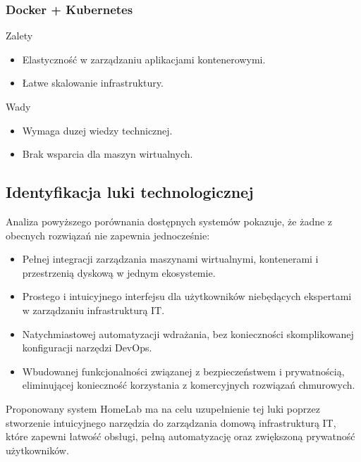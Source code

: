 \subsubsection{Docker \cite{Docker} + Kubernetes \cite{Kubernetes}}
\begin{minipage}{0.45\textwidth}
    Zalety
    \begin{itemize}
        \item Elastyczność w zarządzaniu aplikacjami kontenerowymi.
        \item Łatwe skalowanie infrastruktury.
    \end{itemize}
\end{minipage}\hfil
\begin{minipage}{0.45\textwidth}
    Wady
    \begin{itemize}
        \item Wymaga duzej wiedzy technicznej.
        \item Brak wsparcia dla maszyn wirtualnych.
    \end{itemize}
\end{minipage}


\subsection{Identyfikacja luki technologicznej}
Analiza powyższego porównania dostępnych systemów pokazuje, że żadne z obecnych rozwiązań nie zapewnia jednocześnie:
\begin{itemize}
    \item Pełnej integracji zarządzania maszynami wirtualnymi, kontenerami i przestrzenią dyskową w jednym ekosystemie.
    \item Prostego i intuicyjnego interfejsu dla użytkowników niebędących ekspertami w zarządzaniu infrastrukturą IT.
    \item Natychmiastowej automatyzacji wdrażania, bez konieczności skomplikowanej konfiguracji narzędzi DevOps.
    \item Wbudowanej funkcjonalności związanej z bezpieczeństwem i prywatnością, eliminującej konieczność korzystania z komercyjnych rozwiązań chmurowych.
\end{itemize}

Proponowany system HomeLab ma na celu uzupełnienie tej luki poprzez stworzenie intuicyjnego narzędzia do zarządzania domową infrastrukturą IT, które zapewni łatwość obsługi, pełną automatyzację oraz zwiększoną prywatność użytkowników.
